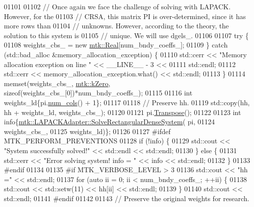 \begin{DoxyCode}
{{01101 
01102   \textcolor{comment}{// Once again we face the challenge of solving with LAPACK. However, for the}
01103   \textcolor{comment}{// CRSA, this matrix PI is over-determined, since it has more rows than}
01104   \textcolor{comment}{// unknowns. However, according to the theory, the solution to this system is}
01105   \textcolor{comment}{// unique. We will use dgels\_.}
01106 
01107   \textcolor{keywordflow}{try} \{
01108     weights\_cbs\_ = \textcolor{keyword}{new} \hyperlink{group__c01-roots_gac080bbbf5cbb5502c9f00405f894857d}{mtk::Real}[num\_bndy\_coeffs\_];
01109   \} \textcolor{keywordflow}{catch} (std::bad\_alloc &memory\_allocation\_exception) \{
01110     std::cerr << \textcolor{stringliteral}{"Memory allocation exception on line "} << \_\_LINE\_\_ - 3 <<
01111       std::endl;
01112     std::cerr << memory\_allocation\_exception.what() << std::endl;
01113   \}
01114   memset(weights\_cbs\_, \hyperlink{group__c01-roots_ga59a451a5fae30d59649bcda274fea271}{mtk::kZero}, \textcolor{keyword}{sizeof}(weights\_cbs\_[0])*num\_bndy\_coeffs\_);
01115 
01116   \textcolor{keywordtype}{int} weights\_ld\{pi.\hyperlink{classmtk_1_1DenseMatrix_a41747502d468c6728a4be31501b16e0e}{num\_cols}() + 1\};
01117 
01118   \textcolor{comment}{// Preserve hh.}
01119   std::copy(hh, hh + weights\_ld, weights\_cbs\_);
01120 
01121   pi.\hyperlink{classmtk_1_1DenseMatrix_a71d9c07ca66e88d97d1fd5012f43138b}{Transpose}();
01122 
01123   \textcolor{keywordtype}{int} info\{\hyperlink{classmtk_1_1LAPACKAdapter_a380f148ffdf96bae2f79ae28f1a6560c}{mtk::LAPACKAdapter::SolveRectangularDenseSystem}(
      pi,
01124                                                            weights\_cbs\_,
01125                                                            weights\_ld)\};
01126 
01127 \textcolor{preprocessor}{  #ifdef MTK\_PERFORM\_PREVENTIONS}
01128   \textcolor{keywordflow}{if} (!info) \{
01129     std::cout << \textcolor{stringliteral}{"System successfully solved!"} << std::endl << std::endl;
01130   \} \textcolor{keywordflow}{else} \{
01131     std::cerr << \textcolor{stringliteral}{"Error solving system! info = "} << info << std::endl;
01132   \}
01133 \textcolor{preprocessor}{  #endif}
01134 
01135 \textcolor{preprocessor}{  #if MTK\_VERBOSE\_LEVEL > 3}
01136   std::cout << \textcolor{stringliteral}{"hh ="} << std::endl;
01137   \textcolor{keywordflow}{for} (\textcolor{keyword}{auto} ii = 0; ii < num\_bndy\_coeffs\_; ++ii) \{
01138     std::cout << std::setw(11) << hh[ii] << std::endl;
01139   \}
01140   std::cout << std::endl;
01141 \textcolor{preprocessor}{  #endif}
01142 
01143   \textcolor{comment}{// Preserve the original weights for research.}
}}
\end{DoxyCode}

